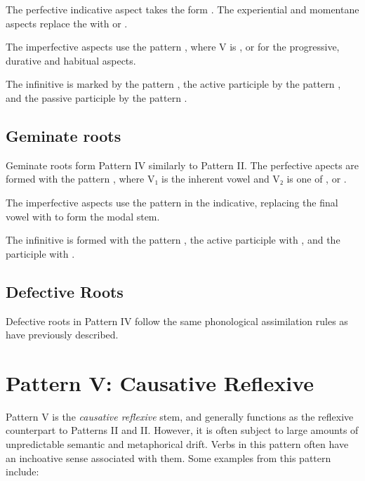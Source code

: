\documentclass[grammar]{subfiles}
\begin{document}
The perfective indicative aspect takes the form . The
experiential and momentane aspects replace the  with  or .

The imperfective aspects use the pattern , where V is
,  or  for the progressive, durative and habitual aspects.

The infinitive is marked by the pattern , the active participle
by the pattern , and the passive participle by the pattern
.


\subsection{Geminate roots}
\label{ssec:vm_iv_geminate_roots}

Geminate roots form Pattern IV similarly to Pattern II.   The perfective apects are formed with the pattern
, where V₁ is the inherent vowel and V₂ is one of ,
 or .

The imperfective aspects use the pattern  in the indicative,
replacing the final vowel with  to form the modal stem. 

The infinitive is formed with the pattern , the active participle
with , and the participle with .  


\subsection{Defective Roots}
\label{ssec:vm_iv_defective_roots}

Defective roots in Pattern IV follow the same phonological assimilation rules
as have previously described. 


\clearpage
\section{Pattern V: Causative Reflexive}
\label{sec:vm_pattern_v}

Pattern V is the \emph{causative reflexive} stem, and generally functions as
the reflexive counterpart to Patterns II and II.  However, it is often subject
to large amounts of unpredictable semantic and metaphorical drift.  Verbs in
this pattern often have an inchoative sense associated with them. Some examples
from this pattern include: 
\end{document}
